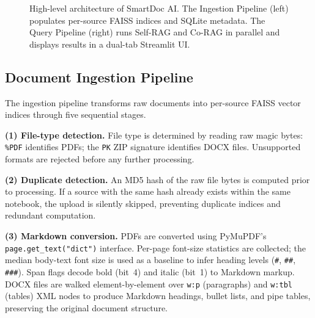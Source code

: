 \documentclass[10pt, conference, a4paper, compsocconf]{IEEEtran}
\begin{document}
\begin{figure}[H]
{%
}%
\caption{High-level architecture of SmartDoc AI. The Ingestion Pipeline
(left) populates per-source FAISS indices and SQLite metadata. The Query
Pipeline (right) runs Self-RAG and Co-RAG in parallel and displays results
in a dual-tab Streamlit UI.}
\label{fig:arch}
\end{figure}

\subsection{Document Ingestion Pipeline}

The ingestion pipeline transforms raw documents into per-source FAISS
vector indices through five sequential stages.

\textbf{(1) File-type detection.} File type is determined by reading
raw magic bytes: \texttt{\%PDF} identifies PDFs; the \texttt{PK} ZIP
signature identifies DOCX files. Unsupported formats are rejected before
any further processing.

\textbf{(2) Duplicate detection.} An MD5 hash of the raw file bytes is
computed prior to processing. If a source with the same hash already exists
within the same notebook, the upload is silently skipped, preventing
duplicate indices and redundant computation.

\textbf{(3) Markdown conversion.} PDFs are converted using
PyMuPDF's \texttt{page.get\_text("dict")} interface. Per-page font-size
statistics are collected; the median body-text font size is used as a
baseline to infer heading levels (\texttt{\#}, \texttt{\#\#}, \texttt{\#\#\#}).
Span flags decode bold (bit~4) and italic (bit~1) to Markdown markup.
DOCX files are walked element-by-element over \texttt{w:p} (paragraphs)
and \texttt{w:tbl} (tables) XML nodes to produce Markdown headings,
bullet lists, and pipe tables, preserving the original document structure.
\end{document}
